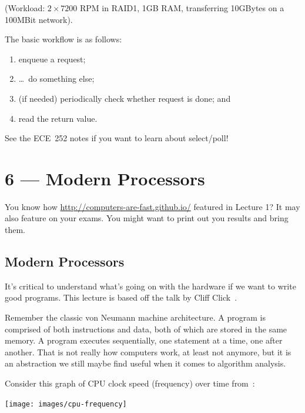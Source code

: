 \documentclass[a4paper]{report}
\begin{document}
(Workload: $2\times 7200$ RPM in RAID1, 1GB RAM, transferring 10GBytes on a 100MBit network).

The basic workflow is as follows: 
   \begin{enumerate}
     \item enqueue a request;
     \item \ldots ~do something else;
     \item (if needed) periodically check whether request is done; and
     \item read the return value.
   \end{enumerate}
   
   See the ECE~252 notes if you want to learn about select/poll!









\chapter*{6 --- Modern Processors}


You know how \url{http://computers-are-fast.github.io/} featured in Lecture 1? It may also feature on your exams. You might want to print out you results and bring them.

\section*{Modern Processors}

It's critical to understand what's going on with the hardware if we want to write good programs. This lecture is based off the talk by Cliff Click~\cite{modern-hardware}.

Remember the classic von Neumann machine architecture. A program is comprised of both instructions and data, both of which are stored in the same memory. A program executes sequentially, one statement at a time, one after another. That is not really how computers work, at least not anymore, but it is an abstraction we still maybe find useful when it comes to algorithm analysis.

Consider this graph of CPU clock speed (frequency) over time from~\cite{cpudb}:

\begin{center}
\texttt{[image: images/cpu-frequency]}
\end{center}
\end{document}
